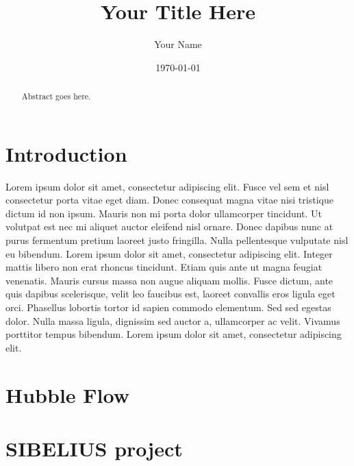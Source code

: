 \documentclass[english, oneside]{HYgradu}
\title{Your Title Here}
\author{Your Name}
\date{\today}
\begin{document}
\maketitle

\begin{abstract}
Abstract goes here.
\end{abstract}

\mytableofcontents



\chapter{Introduction}

Lorem ipsum dolor sit amet, consectetur adipiscing elit. Fusce vel sem et nisl consectetur
porta vitae eget diam. Donec consequat magna vitae nisi tristique dictum id non ipsum.
Mauris non mi porta dolor ullamcorper tincidunt. Ut volutpat est nec mi aliquet auctor
eleifend nisl ornare. Donec dapibus nunc at purus fermentum pretium laoreet justo
fringilla. Nulla pellentesque vulputate nisl eu bibendum. Lorem ipsum dolor sit amet,
consectetur adipiscing elit. Integer mattis libero non erat rhoncus tincidunt. Etiam quis
ante ut magna feugiat venenatis. Mauris cursus massa non augue aliquam mollis. Fusce
dictum, ante quis dapibus scelerisque, velit leo faucibus est, laoreet convallis eros
ligula eget orci. Phasellus lobortis tortor id sapien commodo elementum. Sed sed egestas
dolor. Nulla massa ligula, dignissim sed auctor a, ullamcorper ac velit. Vivamus porttitor
tempus bibendum. Lorem ipsum dolor sit amet, consectetur adipiscing elit.

\chapter{Hubble Flow}

\chapter{SIBELIUS project}
\end{document}
